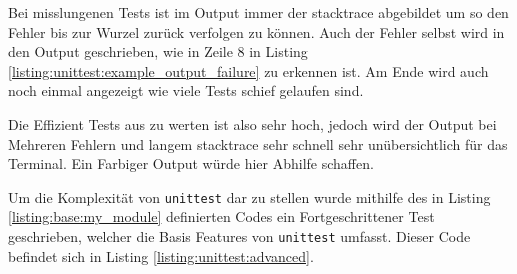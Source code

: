 Bei misslungenen Tests ist im Output immer der \gls{stacktrace} abgebildet um so den Fehler
bis zur Wurzel zurück verfolgen zu können. Auch der Fehler selbst wird in den Output geschrieben,
wie in Zeile 8 in Listing \ref{listing:unittest:example_output_failure} zu erkennen ist. Am
Ende wird auch noch einmal angezeigt wie viele Tests schief gelaufen sind.

Die Effizient Tests aus zu werten ist also sehr hoch, jedoch wird der Output bei Mehreren Fehlern
und langem \gls{stacktrace} sehr schnell sehr unübersichtlich für das Terminal. Ein Farbiger Output
würde hier Abhilfe schaffen.

Um die Komplexität von \lstinline{unittest} dar zu stellen wurde mithilfe des in Listing \ref{listing:base:my_module} definierten Codes ein Fortgeschrittener Test
geschrieben, welcher die Basis Features von \lstinline{unittest} umfasst. Dieser Code
befindet sich in Listing \ref{listing:unittest:advanced}.